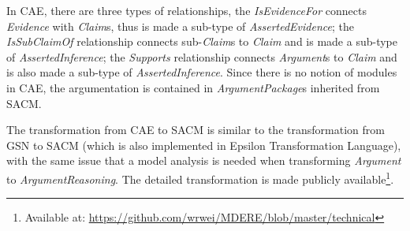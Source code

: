 In CAE, there are three types of relationships, the \textit{IsEvidenceFor} connects \textit{Evidence} with \textit{Claim}s, thus is made a sub-type of \textit{AssertedEvidence}; the \textit{IsSubClaimOf} relationship connects sub-\textit{Claim}s to \textit{Claim} and is made a sub-type of \textit{AssertedInference}; the \textit{Supports} relationship connects \textit{Argument}s to \textit{Claim} and is also made a sub-type of \textit{AssertedInference}. 
Since there is no notion of modules in CAE, the argumentation is contained in \textit{ArgumentPackage}s inherited from SACM.

The transformation from CAE to SACM is similar to the transformation from GSN to SACM (which is also implemented in Epsilon Transformation Language), with the same issue that a model analysis is needed when transforming \textit{Argument} to \textit{ArgumentReasoning}. 
The detailed transformation is made publicly available\footnote{Available at: \url{https://github.com/wrwei/MDERE/blob/master/technical}}.



